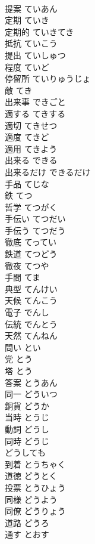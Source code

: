 \documentclass[8pt]{extreport}
\begin{document}
\begin{CJK}{UTF8}{min}
\\	提案	ていあん	
\\	定期	ていき	
\\	定期的	ていきてき	
\\	抵抗	ていこう	
\\	提出	ていしゅつ	
\\	程度	ていど	
\\	停留所	ていりゅうじょ	
\\	敵	てき	
\\	出来事	できごと	
\\	適する	てきする	
\\	適切	てきせつ	
\\	適度	てきど	
\\	適用	てきよう	
\\	出来る	できる	
\\	出来るだけ	できるだけ	
\\	手品	てじな	
\\	鉄	てつ	
\\	哲学	てつがく	
\\	手伝い	てつだい	
\\	手伝う	てつだう	
\\	徹底	てってい	
\\	鉄道	てつどう	
\\	徹夜	てつや	
\\	手間	てま	
\\	典型	てんけい	
\\	天候	てんこう	
\\	電子	でんし	
\\	伝統	でんとう	
\\	天然	てんねん	
\\	問い	とい	
\\	党	とう	
\\	塔	とう	
\\	答案	とうあん	
\\	同一	どういつ	
\\	銅貨	どうか	
\\	当時	とうじ	
\\	動詞	どうし	
\\	同時	どうじ	
\\	どうしても		
\\	到着	とうちゃく	
\\	道徳	どうとく	
\\	投票	とうひょう	
\\	同様	どうよう	
\\	同僚	どうりょう	
\\	道路	どうろ	
\\	通す	とおす	

\end{CJK}
\end{document}
